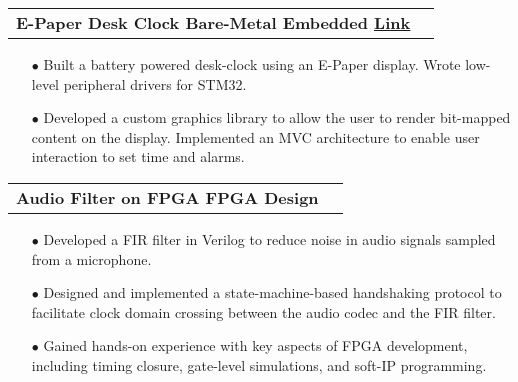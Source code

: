 \documentclass[11pt]{article}
\makeatletter
\newcommand{\resumeSubheadingP}[2]{
  \vspace{-2pt}\item
    \begin{tabular*}{1.0\textwidth}[t]{l@{\extracolsep{\fill}}r}
       \textbf{{\large #1}}&{#2} \\
    \end{tabular*}\vspace{-1pt}
}
\makeatother
\begin{document}
\resumeSubheadingP
{E-Paper Desk Clock \textbar{ } Bare-Metal Embedded \href{https://github.com/parthkharade/Eink-DeskClock}{\small{\textbar{ }\underline{Link} }}}{}
\begin{itemize}[leftmargin=0.3in]\setlength{\itemsep}{0pt}\setlength{\parskip}{0pt}\vspace{-0.2cm}
  \item[$\bullet$] Built a battery powered desk-clock using an E-Paper display. Wrote low-level peripheral drivers for STM32. 
  \item[$\bullet$] Developed a custom graphics library to allow the user to render bit-mapped content on the display. Implemented an MVC architecture to enable user interaction to set time and alarms.
\end{itemize}
\vspace{-0.2cm}


\resumeSubheadingP
{Audio Filter on FPGA \textbar{ } FPGA Design}{ }
\begin{itemize}[leftmargin=0.3in]\setlength{\itemsep}{0pt}\setlength{\parskip}{0pt}\vspace{-0.2cm}
  \item[$\bullet$] Developed a FIR filter in Verilog to reduce noise in audio signals sampled from a microphone.
  \item[$\bullet$] Designed and implemented a state-machine-based handshaking protocol to facilitate clock domain crossing between the audio codec and the FIR filter.
  \item[$\bullet$] Gained hands-on experience with key aspects of FPGA development, including timing closure, gate-level simulations, and soft-IP programming.
\end{itemize}
\vspace{-0.3cm}

%
\end{document}
